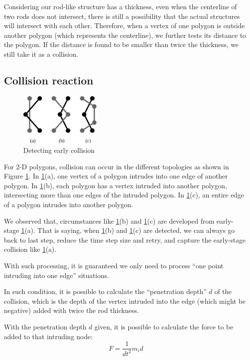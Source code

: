 \documentclass[letterpaper,9pt,twocolumn]{extarticle}
\begin{document}
			Considering our rod-like structure has a thickness, even when the centerline of two rods does not intersect, there is still a possibility that the actual structures will intersect with each other. Therefore, when a vertex of one polygon is outside another polygon (which represents the centerline), we further tests its distance to the polygon. If the distance is found to be smaller than twice the thickness, we still take it as a collision.
		\subsection{Collision reaction}
			\begin{figure}[ht]
				\centering
				\includegraphics[width=4cm]{res/intersections.png}
				\caption{Detecting early collision}
				\label{collision-cases}
			\end{figure}
			For 2-D polygons, collision can occur in the different topologies as shown in Figure \ref{collision-cases}. In \ref{collision-cases}(a), one vertex of a polygon intrudes into one edge of another polygon. In \ref{collision-cases}(b), each polygon has a vertex intruded into another polygon, intersecting more than one edges of the intruded polygon. In \ref{collision-cases}(c), an entire edge of a polygon intrudes into another polygon.
			
			We observed that, circumstances like \ref{collision-cases}(b) and \ref{collision-cases}(c) are developed from early-stage \ref{collision-cases}(a). That is saying, when \ref{collision-cases}(b) and \ref{collision-cases}(c) are detected, we can always go back to last step, reduce the time step size and retry, and capture the early-stage collision like \ref{collision-cases}(a).
			
			With such processing, it is guaranteed we only need to process ``one point intruding into one edge'' situations.
			
			In such condition, it is possible to calculate the ``penetration depth'' $d$ of the collision, which is the depth of the vertex intruded into the edge (which might be negative) added with twice the rod thickness.
			
			With the penetration depth $d$ given, it is possible to calculate the force to be added to that intruding node:
			$$F = \frac1{dt^2}m_i d$$
			
\end{document}
